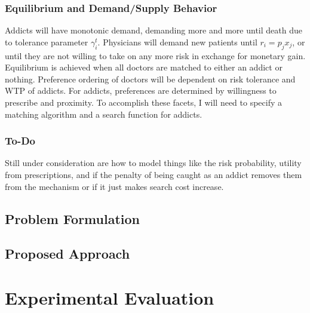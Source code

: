 \documentclass[11pt,a4paper]{article}
\begin{document}
\subsubsection*{Equilibrium and Demand/Supply Behavior}
\label{subsubsec:eq&behavior}

Addicts will have monotonic demand, demanding more and more until death due to tolerance parameter $\gamma_i^t$. Physicians will demand new patients until $r_i = p_jx_j$, or until they are not willing to take on any
more risk in exchange for monetary gain. Equilibrium is achieved when all doctors are matched to either an addict or nothing. Preference ordering of doctors will be dependent on risk tolerance and WTP of addicts.
For addicts, preferences are determined by willingness to prescribe and proximity. To accomplish these facets, I will need to specify a matching algorithm and a search function for addicts.

\subsubsection*{To-Do}
\label{subsubsec:todo}

Still under consideration are how to model things like the risk probability, utility from prescriptions, and if the penalty of being caught as an addict removes them from the mechanism or if it
just makes search cost increase.


\subsection{Problem Formulation}
\label{subsec:formulation}


\subsection{Proposed Approach}
\label{subsec:approach}


\section{Experimental Evaluation}
\label{sec:experiments}
\end{document}
